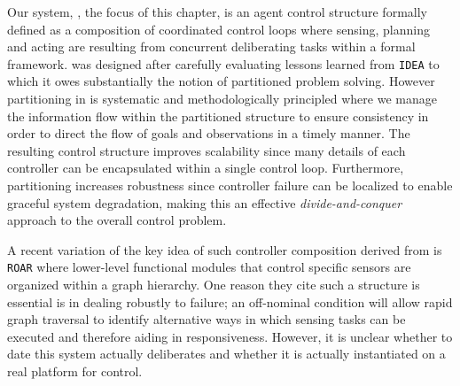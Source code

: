 Our system, \rxe, the focus of this chapter, is an agent control
structure formally defined as a composition of coordinated control
loops where sensing, planning and acting are resulting from concurrent
deliberating tasks within a formal framework.  \rx was designed after
carefully evaluating lessons learned from \texttt{IDEA} to which it
owes substantially the notion of partitioned problem solving. However
partitioning in \rx is systematic and methodologically principled
where we manage the information flow within the partitioned structure
to ensure consistency in order to direct the flow of goals and
observations in a timely manner. The resulting control structure
improves scalability since many details of each controller can be
encapsulated within a single control loop.  Furthermore, partitioning
increases robustness since controller failure can be localized to
enable graceful system degradation, making this an effective
\emph{divide-and-conquer} approach to the overall control problem.

A recent variation of the key idea of such controller composition
derived from \rx is \texttt{ROAR} \cite{degroote11} where lower-level
functional modules that control specific sensors are organized within
a graph hierarchy. One reason they cite such a structure is essential
is in dealing robustly to failure; an off-nominal condition will allow
rapid graph traversal to identify alternative ways in which sensing
tasks can be executed and therefore aiding in responsiveness. However,
it is unclear whether to date this system actually deliberates and
whether it is actually instantiated on a real platform for control.


